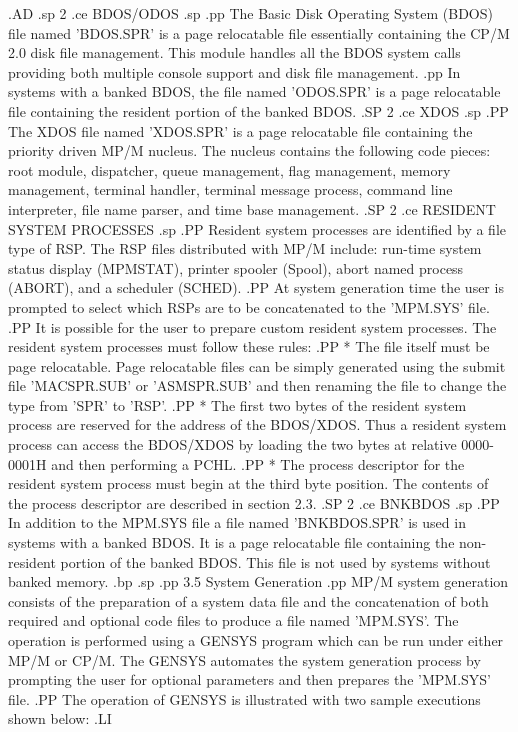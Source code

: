 .AD
.sp 2
.ce
BDOS/ODOS
.sp
.pp
The Basic Disk Operating System (BDOS) file named 'BDOS.SPR' is a page
relocatable
file essentially containing the CP/M 2.0 disk file management.
This module handles all the BDOS system calls providing both multiple
console support and disk file management.
.pp
In systems with a banked BDOS, the file named 'ODOS.SPR' is a page
relocatable file containing the resident portion of the banked BDOS.
.SP 2
.ce
XDOS
.sp
.PP
The XDOS file named 'XDOS.SPR' is a page relocatable file
containing the priority driven MP/M nucleus.  The nucleus contains
the following code pieces: root module, dispatcher,
queue management, flag management, memory management, terminal
handler, terminal message process, command line interpreter, file
name parser, and time base management.
.SP 2
.ce
RESIDENT SYSTEM PROCESSES
.sp
.PP
Resident system processes are identified by a file type of RSP.  The
RSP files distributed with MP/M include: run-time system
status display (MPMSTAT), printer spooler (Spool), abort named
process (ABORT), and a scheduler (SCHED).
.PP
At system generation time the user is prompted to select which RSPs
are to be concatenated to the 'MPM.SYS' file.
.PP
It is possible for the user to prepare custom resident system
processes.  The resident system processes must follow these rules:
.PP
* The file itself must be page relocatable. Page relocatable files
can be simply generated using the submit file 'MACSPR.SUB' or 'ASMSPR.SUB'
and then renaming the file to change the type from 'SPR' to 'RSP'.
.PP
* The first two bytes of the resident system process are reserved
for the address of the BDOS/XDOS.  Thus a resident system process can
access the BDOS/XDOS by loading the two bytes at relative 0000-0001H
and then performing a PCHL.
.PP
* The process descriptor for the resident system process must begin at
the third byte position.  The contents of the process descriptor are
described in section 2.3.
.SP 2
.ce
BNKBDOS
.sp
.PP
In addition to the MPM.SYS file a file named 'BNKBDOS.SPR' is used in
systems with a banked BDOS.  It is a page relocatable file containing
the non-resident portion of the banked BDOS.
This file is not used by systems without banked memory.
.bp
.sp
.pp
3.5 System Generation
.pp
MP/M system generation consists of the preparation of a system
data file and the concatenation of both required and optional code
files to produce a file named 'MPM.SYS'.  The operation is performed
using a GENSYS program which can be run under either MP/M or
CP/M.  The GENSYS automates the system generation process by
prompting the user for optional parameters and then prepares the
'MPM.SYS' file.
.PP
The operation of GENSYS is illustrated with two sample executions
shown below:
.LI

